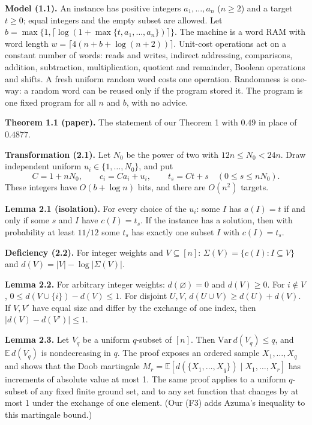 \documentclass[10pt,a4paper]{article}
\begin{document}
\textbf{Model (1.1).} An instance has positive integers $a_1, \dots, a_n$ ($n \ge 2$) and a target $t \ge 0$; equal integers
and the empty subset are allowed. Let $b = \max\{1, \lceil\log(1 + \max\{t, a_1, \dots, a_n\})\rceil\}$. The machine is a
word RAM with word length $w = \lceil 4(n + b + \log(n+2))\rceil$. Unit-cost operations act on a constant number of
words: reads and writes, indirect addressing, comparisons, addition, subtraction, multiplication, quotient and
remainder, Boolean operations and shifts. A fresh uniform random word costs one operation. Randomness is one-way: a
random word can be reused only if the program stored it. The program is one fixed program for all $n$ and $b$, with no
advice.

\textbf{Theorem 1.1 (paper).} The statement of our Theorem 1 with $0.49$ in place of $0.4877$.

\textbf{Transformation (2.1).} Let $N_0$ be the power of two with $12n \le N_0 < 24n$. Draw independent uniform
$u_i \in \{1, \dots, N_0\}$, and put
\[C = 1 + nN_0,\qquad c_i = Ca_i + u_i,\qquad t_s = Ct + s\quad (0 \le s \le nN_0).\]
These integers have $O(b + \log n)$ bits, and there are $O(n^2)$ targets.

\textbf{Lemma 2.1 (isolation).} For every choice of the $u_i$: some $I$ has $a(I) = t$ if and only if some $s$ and $I$ have
$c(I) = t_s$. If the instance has a solution, then with probability at least $11/12$ some $t_s$ has exactly one subset
$I$ with $c(I) = t_s$.

\textbf{Deficiency (2.2).} For integer weights and $V \subseteq [n]$: $\Sigma(V) = \{c(I) : I\subseteq V\}$ and
$d(V) = |V| - \log|\Sigma(V)|$.

\textbf{Lemma 2.2.} For arbitrary integer weights: $d(\varnothing) = 0$ and $d(V) \ge 0$. For $i \notin V$,
$0 \le d(V\cup\{i\}) - d(V) \le 1$. For disjoint $U, V$, $d(U\cup V) \ge d(U) + d(V)$. If $V, V'$ have equal size and
differ by the exchange of one index, then $|d(V) - d(V')| \le 1$.

\textbf{Lemma 2.3.} Let $V_q$ be a uniform $q$-subset of $[n]$. Then $\mathrm{Var}\,d(V_q) \le q$, and $\mathbb E\,d(V_q)$ is
nondecreasing in $q$. The proof exposes an ordered sample $X_1, \dots, X_q$ and shows that the Doob martingale
$M_r = \mathbb E[d(\{X_1, \dots, X_q\}) \mid X_1, \dots, X_r]$ has increments of absolute value at most 1. The same proof
applies to a uniform $q$-subset of any fixed finite ground set, and to any set function that changes by at most 1 under
the exchange of one element. (Our (F3) adds Azuma's inequality to this martingale bound.)
\end{document}
